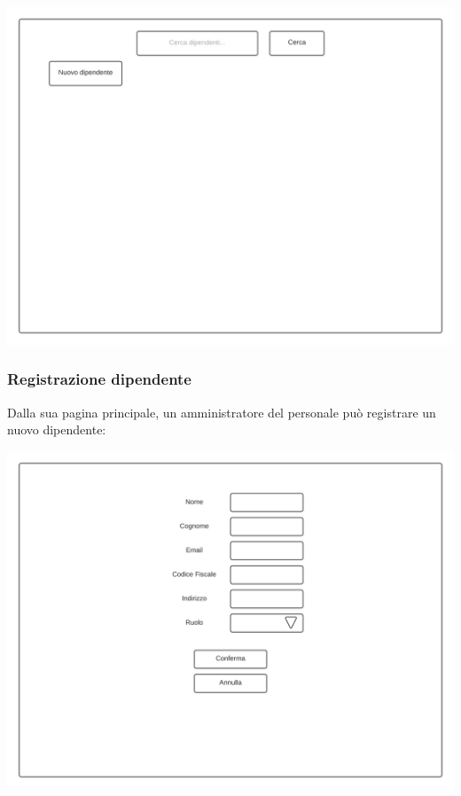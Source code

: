 \documentclass[12pt]{article}
\begin{document}
\begin{center}
\includegraphics[height=0.3\textheight]{Mockup/AmministratorePersonale/PaginaIniziale}
\end{center}

\subsubsection{Registrazione dipendente}
\label{mockup:registrazionedipendente}
Dalla sua pagina principale, un amministratore del personale può registrare un nuovo dipendente:

\begin{center}
\includegraphics[height=0.3\textheight]{Mockup/AmministratorePersonale/Registrazione}
\end{center}
\end{document}
